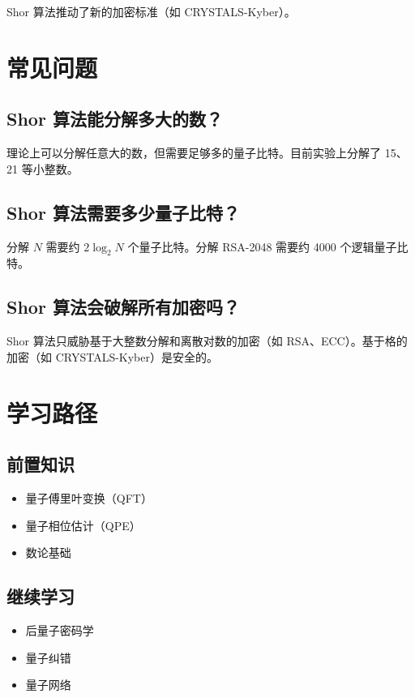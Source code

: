 \documentclass[12pt,a4paper]{article}
\begin{document}
Shor 算法推动了新的加密标准（如 CRYSTALS-Kyber）。

\section{常见问题}

\subsection{Shor 算法能分解多大的数？}

理论上可以分解任意大的数，但需要足够多的量子比特。目前实验上分解了 15、21 等小整数。

\subsection{Shor 算法需要多少量子比特？}

分解 $N$ 需要约 $2\log_2 N$ 个量子比特。分解 RSA-2048 需要约 4000 个逻辑量子比特。

\subsection{Shor 算法会破解所有加密吗？}

Shor 算法只威胁基于大整数分解和离散对数的加密（如 RSA、ECC）。基于格的加密（如 CRYSTALS-Kyber）是安全的。

\section{学习路径}

\subsection{前置知识}
\begin{itemize}
  \item 量子傅里叶变换（QFT）
  \item 量子相位估计（QPE）
  \item 数论基础
\end{itemize}

\subsection{继续学习}
\begin{itemize}
  \item 后量子密码学
  \item 量子纠错
  \item 量子网络
\end{itemize}
\end{document}
